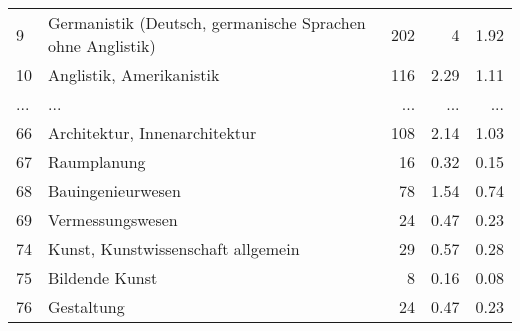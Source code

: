 \begin{longtable}{lXrrr}
        9 & \multicolumn{1}{X}{Germanistik (Deutsch, germanische Sprachen ohne Anglistik)} & %
          \num{202} &
          \num[round-mode=places,round-precision=2]{4} &
          \num[round-mode=places,round-precision=2]{1.92} \\
        10 & \multicolumn{1}{X}{Anglistik, Amerikanistik} & %
          \num{116} &
          \num[round-mode=places,round-precision=2]{2.29} &
          \num[round-mode=places,round-precision=2]{1.11} \\
       ... & ... & ... & ... & ... \\
        66 & \multicolumn{1}{X}{Architektur, Innenarchitektur} & %
          \num{108} &
          \num[round-mode=places,round-precision=2]{2.14} &
          \num[round-mode=places,round-precision=2]{1.03} \\

        67 & \multicolumn{1}{X}{Raumplanung} & %
          \num{16} &
          \num[round-mode=places,round-precision=2]{0.32} &
          \num[round-mode=places,round-precision=2]{0.15} \\

        68 & \multicolumn{1}{X}{Bauingenieurwesen} & %
          \num{78} &
          \num[round-mode=places,round-precision=2]{1.54} &
          \num[round-mode=places,round-precision=2]{0.74} \\

        69 & \multicolumn{1}{X}{Vermessungswesen} & %
          \num{24} &
          \num[round-mode=places,round-precision=2]{0.47} &
          \num[round-mode=places,round-precision=2]{0.23} \\

        74 & \multicolumn{1}{X}{Kunst, Kunstwissenschaft allgemein} & %
          \num{29} &
          \num[round-mode=places,round-precision=2]{0.57} &
          \num[round-mode=places,round-precision=2]{0.28} \\

        75 & \multicolumn{1}{X}{Bildende Kunst} & %
          \num{8} &
          \num[round-mode=places,round-precision=2]{0.16} &
          \num[round-mode=places,round-precision=2]{0.08} \\

        76 & \multicolumn{1}{X}{Gestaltung} & %
          \num{24} &
          \num[round-mode=places,round-precision=2]{0.47} &
          \num[round-mode=places,round-precision=2]{0.23} \\


\end{longtable}
